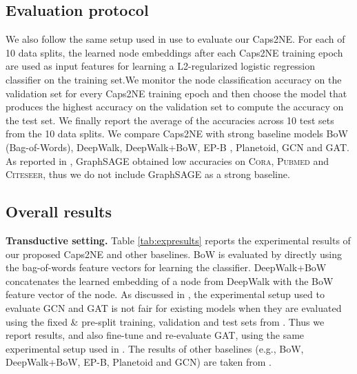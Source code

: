 \documentclass[sigconf]{acmart}
\begin{document}
\subsection{Evaluation protocol}
\label{subsec:eval}

We also follow the same setup used in \citet{duran2017learning} use to evaluate our Caps2NE. 
For each of 10 data splits, the learned node embeddings after each Caps2NE training epoch are used as input features for learning a L2-regularized logistic regression classifier \citep{Fan:2008}
on the training set.We monitor the node classification accuracy on the validation set for every Caps2NE training epoch and then choose the model that produces the highest accuracy on the validation set to compute the accuracy on the test set. 
We finally report the average of the accuracies across 10 test sets from the 10 data splits.
We compare Caps2NE with strong baseline models  BoW (Bag-of-Words), DeepWalk, DeepWalk+BoW, EP-B \citep{duran2017learning}, Planetoid, GCN and GAT.
As reported in \citep{guo2018spine}, GraphSAGE obtained low accuracies on \textsc{Cora}, \textsc{Pubmed} and \textsc{Citeseer}, thus we do not include GraphSAGE as a strong baseline.




\subsection{Overall results}

\textbf{Transductive setting.} Table \ref{tab:expresults} reports the experimental results of our proposed Caps2NE and other baselines. BoW is evaluated by directly using the bag-of-words feature vectors for learning the classifier. 
DeepWalk+BoW concatenates the learned embedding of a node from DeepWalk with the BoW feature vector of the node.
As discussed in \citet{duran2017learning}, the experimental setup used to evaluate GCN  and GAT  is not fair for existing models when they are evaluated using the fixed \& pre-split training, validation and test sets from \citet{Yang:2016planetoid}.
Thus we report results, and also  fine-tune and re-evaluate GAT,  
using the same experimental setup used in \citet{duran2017learning}.
The results of other baselines (e.g., BoW, DeepWalk+BoW, EP-B, Planetoid and GCN) are taken from \citet{duran2017learning}.
\end{document}
